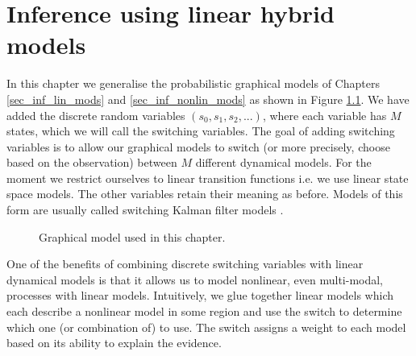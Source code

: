 \chapter{Inference using linear hybrid models}
\label{sec_inf_lin_hybrid}
In this chapter we generalise the probabilistic graphical models of Chapters \ref{sec_inf_lin_mods} and \ref{sec_inf_nonlin_mods} as shown in Figure \ref{fig_hybridmod1}. We have added the discrete random variables $(s_0,s_1, s_2,...)$, where each variable has $M$ states, which we will call the switching variables. The goal of adding switching variables is to allow our graphical models to switch (or more precisely, choose based on the observation) between $M$ different dynamical models. For the moment we restrict ourselves to linear transition functions i.e. we use linear state space models. The other variables retain their meaning as before. Models of this form are usually called switching Kalman filter models \cite{murphy1}. 
\begin{figure}[H] 
\centering
{}
\caption{Graphical model used in this chapter.}
\label{fig_hybridmod1}
\end{figure}
One of the benefits of combining discrete switching variables with linear dynamical models is that it allows us to model nonlinear, even multi-modal, processes with linear models. Intuitively, we glue together linear models which each describe a nonlinear model in some region and use the switch to determine which one (or combination of) to use. The switch assigns a weight to each model based on its ability to explain the evidence. 

